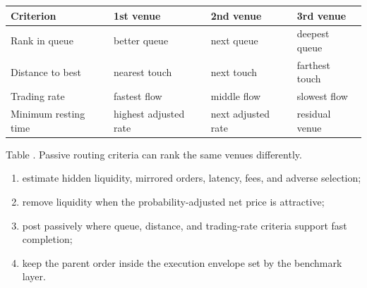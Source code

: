 \documentclass[a4paper,oneside,openany]{book}
\begin{document}
\begin{table}[htbp]
\centering
\scriptsize
{}
\renewcommand{\arraystretch}{1.12}
\setlength{\tabcolsep}{4pt}
\begin{tabularx}{\textwidth}{@{}>{\RaggedRight\arraybackslash}p{} >{\RaggedRight\arraybackslash}p{} >{\RaggedRight\arraybackslash}p{} >{\RaggedRight\arraybackslash}X@{}}
\hline
\textbf{Criterion} & \textbf{1st venue} & \textbf{2nd venue} & \textbf{3rd venue} \\
\hline
Rank in queue & better queue & next queue & deepest queue \\
Distance to best & nearest touch & next touch & farthest touch \\
Trading rate & fastest flow & middle flow & slowest flow \\
Minimum resting time & highest adjusted rate & next adjusted rate & residual venue \\
\hline
\end{tabularx}

\vspace{0.25em}
{\footnotesize Table \thetable. Passive routing criteria can rank the same venues differently.}
\end{table}

\begin{process} 
\begin{enumerate}[label=\roman*.]
\setlength{\itemsep}{0pt}
\item estimate hidden liquidity, mirrored orders, latency, fees, and adverse selection;
\item remove liquidity when the probability-adjusted net price is attractive;
\item post passively where queue, distance, and trading-rate criteria support fast completion;
\item keep the parent order inside the execution envelope set by the benchmark layer.
\end{enumerate}
\end{process}
\end{document}
